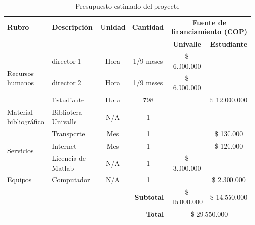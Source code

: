 \begin{table}[h!]
\centering
\small
\begin{tabular}{|l|l|c|c|cc|}
\hline
\rowcolor[HTML]{BFEFFF}
\textbf{Rubro} & \textbf{Descripción} & \textbf{Unidad} & \textbf{Cantidad} & \multicolumn{2}{c|}{\textbf{Fuente de financiamiento (COP)}} \\
\rowcolor[HTML]{BFEFFF}
              &                      &                 &                    & \textbf{Univalle} & \textbf{Estudiante} \\
\hline
\multirow{3}{*}{Recursos humanos} 
    & director 1       & Hora         & 1/9 meses   & \$ 6.000.000  &                \\
    & director 2       & Hora         & 1/9 meses   & \$ 6.000.000  &                \\
    & Estudiante       & Hora         & 798         &               & \$ 12.000.000  \\
\hline
\multirow{1}{*}{Material bibliográfico} 
    & Biblioteca Univalle & N/A       & 1           &               &                \\
\hline
\multirow{3}{*}{Servicios} 
    & Transporte       & Mes          & 1           &               & \$ 130.000     \\
    & Internet         & Mes          & 1           &               & \$ 120.000     \\
    & Licencia de Matlab & N/A       & 1           & \$ 3.000.000  &                \\
\hline
\multirow{1}{*}{Equipos} 
    & Computador       & N/A          & 1           &               & \$ 2.300.000   \\
\hline
\multicolumn{4}{|r|}{\textbf{Subtotal}} & \$ 15.000.000 & \$ 14.550.000 \\
\hline
\multicolumn{4}{|r|}{\textbf{Total}} & \multicolumn{2}{c|}{\$ 29.550.000} \\
\hline
\end{tabular}
\caption{Presupuesto estimado del proyecto}
\end{table}